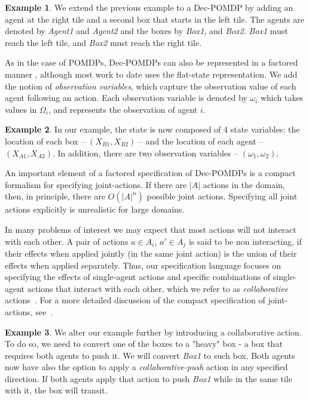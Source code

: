 \documentclass[letterpaper]{article} %
\theoremstyle{definition}
\newtheorem{example}{Example}
\begin{document}
\begin{example}
We extend the previous example 
to a Dec-POMDP by adding an agent at the right tile and a second box that starts in the left tile. The agents are denoted by \emph{Agent1} and \emph{Agent2} and the boxes by \emph{Box1}, and \emph{Box2}. \emph{Box1} must reach the left tile, and \emph{Box2} must reach the right tile.
\end{example}

As in the case of POMDPs, Dec-POMDPs can also be represented in a factored manner \cite{FDECPOMDP}, although most work to date uses the flat-state representation.
We add the notion of \emph{observation variables}, which capture the observation value of each agent following an action. Each observation variable is denoted by $\omega_i$ which takes values in $\Omega_i$, and represents the observation of agent $i$.

\begin{example}
In our example, the state is now composed of 4 state variables: the location of each box -- $(X_{B1}, X_{B2})$ -- and the location of each agent -- $(X_{A1}, X_{A2})$. In addition, there are two observation variables -- $(\omega_1, \omega_2)$.
\end{example}

An important element of a factored specification of Dec-POMDPs is a compact formalism for specifying joint-actions. If there are $|A|$ actions in the domain, then, in principle, there are $O(|A|^n)$ possible joint actions. Specifying all joint actions explicitly is unrealistic for large domains. 

In many problems of interest we may expect
that most actions will not interact with each other. A pair of actions $a\in A_i$, $a' \in A_j$ is said to be non interacting, if their effects when applied jointly (in the same joint action) is the union of their effects when applied separately.
Thus, our specification language focuses on specifying
the effects of single-agent actions and specific
combinations of single-agent actions that interact with each other, which we refer to as {\em collaborative} actions~\cite{IMAP}.
For a more detailed discussion of the compact specification of joint-actions, see~\cite{QDECPOMDPPLAN2}. 

\begin{example}
We alter our example further by introducing a collaborative action. To do so, we need to convert one of the boxes to a "heavy" box - a box that requires both agents to push it. We will convert \emph{Box1} to such box. Both agents now have also the option to apply a \emph{collaborative-push} action in any specified direction. If both agents apply that action to push \emph{Box1} while in the same tile with it, the box will transit.
\end{example}
\end{document}
